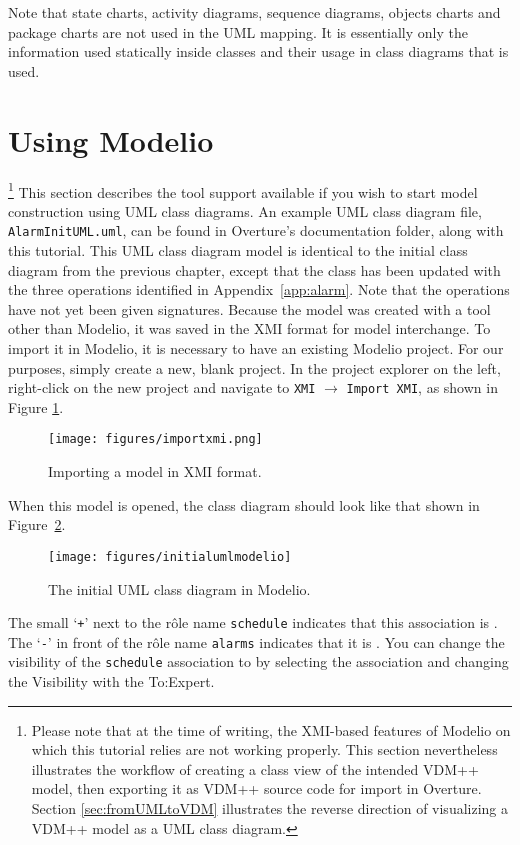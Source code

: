 
Note that state charts, activity diagrams, sequence diagrams, objects charts and package charts are not used in the UML mapping. It is essentially only the information used statically inside classes and their usage in class diagrams that is used.
%
\section{Using Modelio}\label{sec:Rose}
\footnote{Please note that at the time of writing, the XMI-based features of Modelio on which this tutorial relies are not working properly.  This section nevertheless illustrates the workflow of creating a class view of the intended VDM++ model, then exporting it as VDM++ source code for import in Overture.  Section \ref{sec:fromUMLtoVDM} illustrates the reverse direction of visualizing a VDM++ model as a UML class diagram.}
%
This section describes the tool support available if you wish to start model construction using UML class diagrams.  An example UML class diagram file, \texttt{AlarmInitUML.uml}, can be found in Overture's documentation folder, along with this tutorial.  This UML class diagram model is identical to the initial class diagram from the previous chapter, except that the  class has been updated with the three operations identified in Appendix~\ref{app:alarm}.
Note that the operations have not yet been given signatures.  Because the model was created with a tool other than Modelio, it was saved in the XMI format for model interchange.  To import it in Modelio, it is necessary to have an existing Modelio project.  For our purposes, simply create a new, blank project.  In the project explorer on the left, right-click on the new project and navigate to \texttt{XMI} $\rightarrow$ \texttt{Import XMI}, as shown in Figure \ref{fig:importxmi}.
%
\begin{figure}[htbp]
\begin{center}
\texttt{[image: figures/importxmi.png]}
\caption{Importing a model in XMI format.}
\label{fig:importxmi}
\end{center}
\end{figure}
%
When this model is opened, the class diagram should look like that shown in Figure~\ref{fig:initialumlmodelio}.
%
\begin{figure}[htbp]
\begin{center}
\texttt{[image: figures/initialumlmodelio]}
\caption{The initial UML class diagram in Modelio.\label{fig:initialumlmodelio}}
\end{center}
\end{figure}
%
The small `\texttt{+}' next to the r\^{o}le name \texttt{schedule} indicates that this association is . The `\texttt{-}' in front of the r\^{o}le name \texttt{alarms} indicates that it is . You can change the visibility of the \texttt{schedule} association to  by selecting the association and changing the \textsf{Visibility} with the \textsf{To:Expert}.

